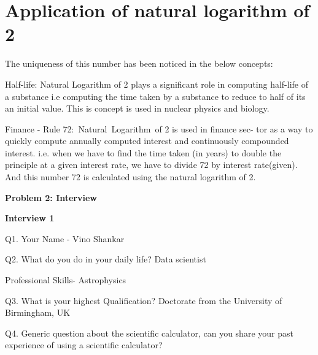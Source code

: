 \documentclass[12pt]{article}
\begin{document}
\vspace{\baselineskip}

\vspace{\baselineskip}
\section*{Application of natural logarithm of 2}
The uniqueness of this number has been noticed in the below concepts:\par

Half-life: Natural Logarithm of 2 plays a significant role in computing half-life of a substance i.e computing the time taken by a substance to reduce to half of its an initial value. This is concept is used in nuclear physics and biology.\par

Finance - Rule 72:\ Natural\ Logarithm\ of 2 is used in finance sec-    tor as a way to quickly compute annually computed interest and continuously compounded interest. i.e. when we have to find the time taken (in years) to double the principle at a given interest rate, we have to divide 72 by interest rate(given). And this number 72 is calculated using the natural logarithm of 2.\par


\vspace{\baselineskip}
\textbf{Problem 2: Interview}\par

\textbf{Interview 1}\par

Q1. Your Name - Vino Shankar\par


\vspace{\baselineskip}
Q2. What do you do in your daily life? Data scientist\par

Professional Skills- Astrophysics\par


\vspace{\baselineskip}
Q3. What is your highest Qualification? Doctorate from the University of Birmingham, UK\par


\vspace{\baselineskip}
Q4. Generic question about the scientific calculator, can you share your past experience of using a scientific calculator?\par
\end{document}
